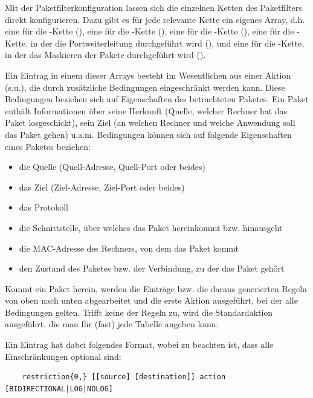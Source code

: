 Mit der Paketfilterkonfiguration lassen sich die einzelnen
Ketten des Paketfilters direkt konfigurieren. Dazu gibt es für
jede relevante Kette ein eigenes Array, d.h. eine für die
-Kette (), eine für die
-Kette (), eine für die
-Kette (), eine für die
-Kette, in der die Portweiterleitung durchgeführt wird
(), und eine für die -Kette,
in der das Maskieren der Pakete durchgeführt wird ().

Ein Eintrag in einem dieser Arrays besteht im
Wesentlichen aus einer Aktion (s.u.),
die durch zusätzliche Bedingungen eingeschränkt werden kann. Diese Bedingungen
beziehen sich auf Eigenschaften des betrachteten Paketes. Ein Paket
enthält Informationen über seine Herkunft (Quelle, welcher Rechner hat
das Paket losgeschickt), sein Ziel (an welchen Rechner und welche
Anwendung soll das Paket gehen) u.a.m. Bedingungen können sich auf
folgende Eigenschaften eines Paketes beziehen:

\begin{itemize}
  \item die Quelle (Quell-Adresse, Quell-Port oder beides)
  \item das Ziel (Ziel-Adresse, Ziel-Port oder beides)
  \item das Protokoll
  \item die Schnittstelle, über welches das Paket hereinkommt bzw. hinausgeht
  \item die MAC-Adresse des Rechners, von dem das Paket kommt
  \item den Zustand des Paketes bzw. der Verbindung, zu der das Paket gehört
\end{itemize}

Kommt ein Paket herein, werden die Einträge bzw. die daraus generierten
Regeln von oben nach unten abgearbeitet und die erste Aktion
ausgeführt, bei der alle Bedingungen gelten.  Trifft keine der Regeln
zu, wird die Standardaktion ausgeführt, die man für (fast) jede
Tabelle angeben kann.

Ein Eintrag hat dabei folgendes Format, wobei zu beachten ist, dass
alle Einschränkungen optional sind:

\begin{example}
\begin{verbatim}
    restriction{0,} [[source] [destination]] action [BIDIRECTIONAL|LOG|NOLOG]
\end{verbatim}
\end{example}

